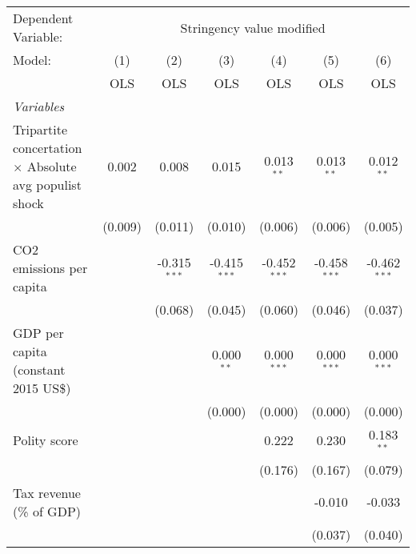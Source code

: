 
\begingroup
\centering
\begin{tabular}{lcccccc}
   \toprule
   Dependent Variable: & \multicolumn{6}{c}{Stringency value modified}\\
   Model:                                                        & (1)     & (2)            & (3)            & (4)            & (5)            & (6)\\  
                                                                 &  OLS    & OLS            & OLS            & OLS            & OLS            & OLS\\  
   \midrule
   \emph{Variables}\\
   Tripartite concertation $\times$ Absolute avg populist shock  & 0.002   & 0.008          & 0.015          & 0.013$^{**}$   & 0.013$^{**}$   & 0.012$^{**}$\\   
                                                                 & (0.009) & (0.011)        & (0.010)        & (0.006)        & (0.006)        & (0.005)\\   
   CO2 emissions per capita                                      &         & -0.315$^{***}$ & -0.415$^{***}$ & -0.452$^{***}$ & -0.458$^{***}$ & -0.462$^{***}$\\   
                                                                 &         & (0.068)        & (0.045)        & (0.060)        & (0.046)        & (0.037)\\   
   GDP per capita (constant 2015 US\$)                           &         &                & 0.000$^{**}$   & 0.000$^{***}$  & 0.000$^{***}$  & 0.000$^{***}$\\   
                                                                 &         &                & (0.000)        & (0.000)        & (0.000)        & (0.000)\\   
   Polity score                                                  &         &                &                & 0.222          & 0.230          & 0.183$^{**}$\\   
                                                                 &         &                &                & (0.176)        & (0.167)        & (0.079)\\   
   Tax revenue (\% of GDP)                                       &         &                &                &                & -0.010         & -0.033\\   
                                                                 &         &                &                &                & (0.037)        & (0.040)\\   

\end{tabular}

